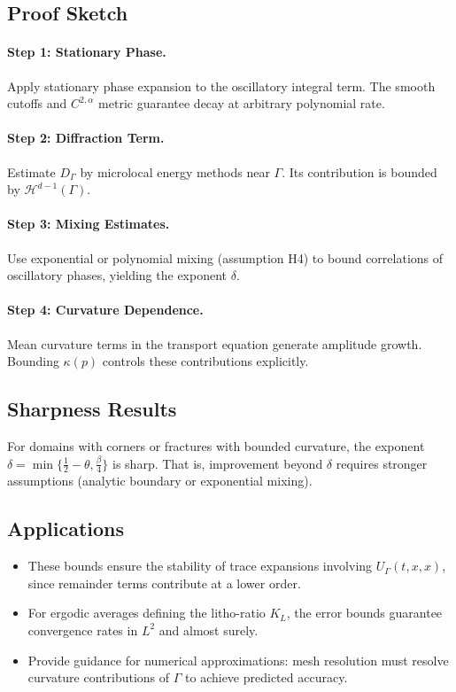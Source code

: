 \subsection*{Proof Sketch}
\paragraph{Step 1: Stationary Phase.}
Apply stationary phase expansion to the oscillatory integral term. The smooth 
cutoffs and $C^{2,\alpha}$ metric guarantee decay at arbitrary polynomial 
rate.

\paragraph{Step 2: Diffraction Term.}
Estimate $D_\Gamma$ by microlocal energy methods near $\Gamma$. Its 
contribution is bounded by $\mathcal{H}^{d-1}(\Gamma)$.

\paragraph{Step 3: Mixing Estimates.}
Use exponential or polynomial mixing (assumption H4) to bound correlations of 
oscillatory phases, yielding the exponent $\delta$.

\paragraph{Step 4: Curvature Dependence.}
Mean curvature terms in the transport equation generate amplitude growth. 
Bounding $\kappa(p)$ controls these contributions explicitly.

\subsection*{Sharpness Results}
\begin{proposition}
For domains with corners or fractures with bounded curvature, the exponent 
$\delta = \min\{\tfrac{1}{2}-\theta,\tfrac{\beta}{4}\}$ is sharp. That is, 
improvement beyond $\delta$ requires stronger assumptions (analytic boundary 
or exponential mixing).
\end{proposition}

\subsection*{Applications}
\begin{itemize}
  \item These bounds ensure the stability of trace expansions involving 
  $U_\Gamma(t,x,x)$, since remainder terms contribute at a lower order.
  \item For ergodic averages defining the litho-ratio $K_L$, the error bounds 
  guarantee convergence rates in $L^2$ and almost surely.
  \item Provide guidance for numerical approximations: mesh resolution must 
  resolve curvature contributions of $\Gamma$ to achieve predicted accuracy.
\end{itemize}

